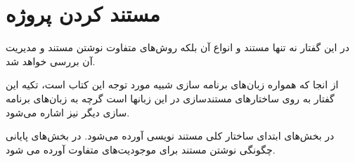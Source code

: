 

\chapter{مستند کردن پروژه}

در این گفتار نه تنها مستند و انواع آن بلکه روش‌های متفاوت نوشتن مستند و مدیریت
آن بررسی خواهد شد.

از انجا که همواره زبان‌های برنامه سازی شبیه  مورد توجه این کتاب است،
تکیه این گفتار به روی ساختارهای مستندسازی در این زبانها است گرچه به زبان‌های
برنامه سازی دیگر نیز اشاره می‌شود.

 در بخش‌های ابتدای ساختار کلی مستند نویسی آورده می‌شود. در بخش‌های پایانی
چگونگی نوشتن مستند برای موجودیت‌های متفاوت آورده می شود.





% 
% 


% 
% 
% 